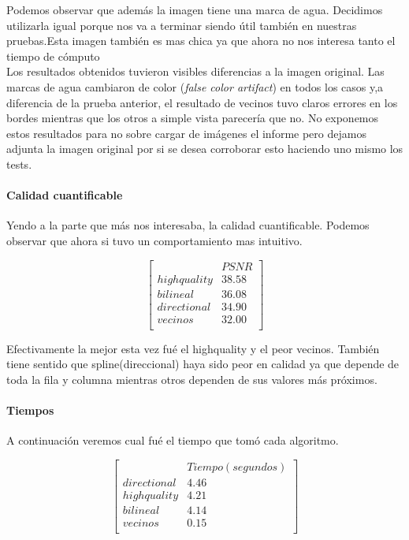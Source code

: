 {\begin{figure}[!htb]
\end{figure}

Podemos observar que además la imagen tiene una marca de agua. Decidimos utilizarla igual porque nos va a terminar siendo útil también en nuestras pruebas.Esta imagen también es mas chica ya que ahora no nos interesa tanto el tiempo de cómputo\\
Los resultados obtenidos tuvieron visibles diferencias a la imagen original. Las marcas de agua cambiaron de color (\textit{false color artifact}) en todos los casos y,a diferencia de la prueba anterior, el resultado de vecinos tuvo claros errores en los bordes mientras que los otros a simple vista parecería que no. No exponemos estos resultados para no sobre cargar de imágenes el informe pero dejamos adjunta la imagen original por si se desea corroborar esto haciendo uno mismo los tests.\\
\paragraph{Calidad cuantificable}
Yendo a la parte que más nos interesaba, la calidad cuantificable. Podemos observar que ahora si tuvo un comportamiento mas intuitivo.

$$ 
\begin{bmatrix}
           &      PSNR     \\
       highquality    &   38.58   \\
       bilineal       &   36.08  \\
       directional    &   34.90    \\
       vecinos        &   32.00      \\
\end{bmatrix} 
$$

Efectivamente la mejor esta vez fué el highquality y el peor vecinos. También tiene sentido que spline(direccional) haya sido peor en calidad ya que depende de toda la fila y columna mientras otros dependen de sus valores más próximos.
\paragraph{Tiempos}
A continuación veremos cual fué el tiempo que tomó cada algoritmo.

$$ 
\begin{bmatrix}
           &      Tiempo (segundos)     \\
       directional    &   4.46    \\
       highquality    &   4.21   \\
       bilineal       &   4.14   \\
       vecinos        &   0.15      \\
\end{bmatrix} 
$$

}
